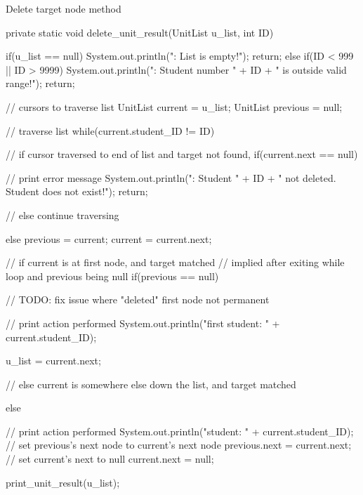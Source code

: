 \begin{listing}[H]
\caption{Delete target node method}
\begin{javacode}
private static void delete_unit_result(UnitList u_list, int ID) {

    if(u_list == null) {
        System.out.println("\nError: List is empty!");
        return;
    } else if(ID < 999 || ID > 9999) {
        System.out.println("\nError: Student number " 
                + ID + " is outside valid range!");
        return;
    }

    // cursors to traverse list
    UnitList current = u_list;
    UnitList previous = null;

    // traverse list
    while(current.student_ID != ID) {

        // if cursor traversed to end of list and target not found,
        if(current.next == null) {

            // print error message
            System.out.println("\nError: Student " 
                    + ID + " not deleted. Student does not exist!");
            return;

        // else continue traversing
        } else {
            previous = current;
            current = current.next;
        }
    }

    // if current is at first node, and target matched
    // implied after exiting while loop and previous being null
    if(previous == null) {

        // TODO: fix issue where "deleted" first node not permanent

        // print action performed
        System.out.println("\nDeleted first student: " + current.student_ID);

        u_list = current.next;

    // else current is somewhere else down the list, and target matched
    } else {

        // print action performed
        System.out.println("\nDeleted student: " + current.student_ID);
        // set previous's next node to current's next node
        previous.next = current.next;
        // set current's next to null
        current.next = null;
    }

    print_unit_result(u_list);
}
\end{javacode}
\end{listing}

